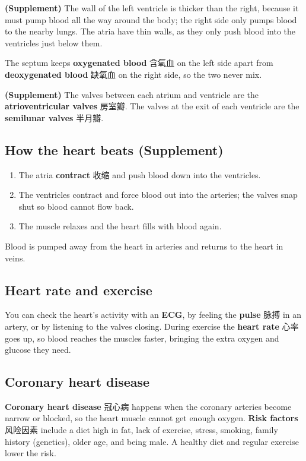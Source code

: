 \documentclass[11pt]{article}
\begin{document}
\textbf{(Supplement)} The wall of the left ventricle is thicker than the right, because it must pump blood all the way around the body; the right side only pumps blood to the nearby lungs. The atria have thin walls, as they only push blood into the ventricles just below them.

The septum keeps \textbf{oxygenated blood} 含氧血 on the left side apart from \textbf{deoxygenated blood} 缺氧血 on the right side, so the two never mix.

\textbf{(Supplement)} The valves between each atrium and ventricle are the \textbf{atrioventricular valves} 房室瓣. The valves at the exit of each ventricle are the \textbf{semilunar valves} 半月瓣.

\subsection*{How the heart beats (Supplement)}

\begin{enumerate}
\item The atria \textbf{contract} 收缩 and push blood down into the ventricles.

\item The ventricles contract and force blood out into the arteries; the valves snap shut so blood cannot flow back.

\item The muscle relaxes and the heart fills with blood again.

\end{enumerate}

Blood is pumped away from the heart in arteries and returns to the heart in veins.

\subsection*{Heart rate and exercise}

You can check the heart's activity with an \textbf{ECG}, by feeling the \textbf{pulse} 脉搏 in an artery, or by listening to the valves closing. During exercise the \textbf{heart rate} 心率 goes up, so blood reaches the muscles faster, bringing the extra oxygen and glucose they need.

\subsection*{Coronary heart disease}

\textbf{Coronary heart disease} 冠心病 happens when the coronary arteries become narrow or blocked, so the heart muscle cannot get enough oxygen. \textbf{Risk factors} 风险因素 include a diet high in fat, lack of exercise, stress, smoking, family history (genetics), older age, and being male. A healthy diet and regular exercise lower the risk.
\end{document}
